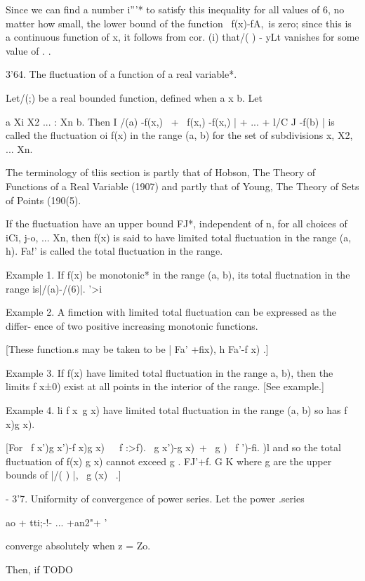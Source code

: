 Since we can find a number i'''* to satisfy this inequality for all
values of 6, no matter how small, the lower bound of the function \
f(x)-fA,\ is zero; since this is a continuous function of x, it
follows from cor. (i) that/( ) - yLt vanishes for some value of
. .

3'64. The fluctuation of a function of a real variable*.

Let/(;) be a real bounded function, defined when a x b. Let

a Xi X2 ... : Xn b. Then I /(a) -f(x,) \ + \ f(x,) -f(x,) | + ... +
l/C J -f(b) | is called the fluctuation oi f(x) in the range (a, b)
for the set of subdivisions x, X2, ... Xn.

The terminology of tliis section is partly that of Hobson, The Theory
of Functions of a Real Variable (1907) and partly that of Young, The
Theory of Sets of Points (190(5).

%
%

If the fluctuation have an upper bound FJ*, independent of n, for all
choices of iCi, j-o, ... Xn, then f(x) is said to have limited total
fluctuation in the range (a, h). Fa!' is called the total fluctuation
in the range.

Example 1. If f(x) be monotonic* in the range (a, b), its total
fluctnation in the range is|/(a)-/(6)|. '>i

Example 2. A fimction with limited total fluctuation can be expressed
as the differ- ence of two positive increasing monotonic functions.

[These function.s may be taken to be | Fa' +fix), h Fa'-f x) .]

Example 3. If f(x) have limited total fluctuation in the range a, b),
then the limits f x±0) exist at all points in the interior of the
range. [See\hardsectionref{3}{2} example.]

Example 4. li f x\ g x) have limited total fluctuation in the range
(a, b) so has f x)g x).

[For \ f x')g x')-f x)g x)\ \ \ f :>f). \ g x')-g x)\ + \ g ) \ f
')-fi. )l and so the total fluctuation of f(x) g x) cannot exceed g .
FJ'+f. G K where g are the upper bounds of |/( ) |, \ g (x) \ .]

- 3'7. Uniformity of convergence of power series. Let the power
.series

ao + tti;-!- ... +an2"+  '

converge absolutely when z = Zo.

Then, if
TODO

